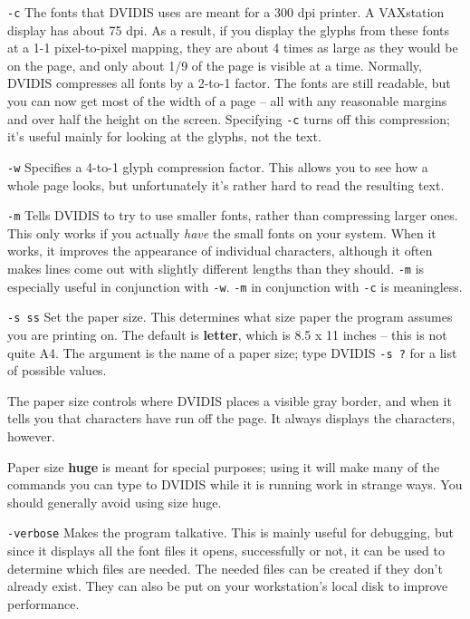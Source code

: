 \begin{list}%
{}%
{\settowidth{\labelwidth}{\tt-verbose a}
\settowidth{\labelsep}{aaaa}
\settowidth{\rightmargin}{aaa}
\addtolength{\labelwidth}{\labelsep}
\setlength{\leftmargin}{\labelwidth}}
%
\item[\tt-c]  The fonts that DVIDIS uses are meant for a 300 dpi printer.
A VAXstation display has about 75 dpi.
As a result, if you display the glyphs from these fonts at a 1-1 pixel-to-pixel
mapping, they are about 4 times as large as they would be on the page, and only
about 1/9 of the page is visible at a time.
Normally, DVIDIS compresses all fonts by a 2-to-1 factor.
The fonts are still readable, but you can now get most of the width of a page --
all with any reasonable margins and over half the height on the screen. 
Specifying {\tt-c} turns off this compression; it's useful mainly for
looking at the glyphs, not the text. 
\item[\tt-w] Specifies a 4-to-1 glyph compression factor.
This allows you to see how a whole page looks, but unfortunately it's rather
hard to read the resulting text.
\item[\tt-m]
Tells DVIDIS to try to use smaller fonts, rather than compressing
larger ones.
This only works if you actually {\it have} the small fonts on your system.
When it works, it improves the appearance of individual
characters, although it often makes lines come out with slightly
different lengths than they should.
{\tt-m} is especially useful in conjunction with {\tt-w}.
{\tt-m} in conjunction with {\tt-c} is meaningless.
\item[\tt-s ss] Set the paper size.
This determines what size paper the program assumes you are printing on.
The default is {\bf letter}, which is 8.5 x 11 inches -- this is not quite A4.
The argument is the name of a paper size; type DVIDIS {\tt-s ?} for a list
of possible values.

The paper size controls where DVIDIS places a visible gray border,
and when it tells you that characters have run off the page. 
It always displays the characters, however.

Paper size {\bf huge} is meant for special purposes; using it will make
many of the commands you can type to DVIDIS while it is running work
in strange ways.
You should generally avoid using size huge.

\item[\tt-verbose]
Makes the program talkative.
This is mainly useful for debugging, but since it displays all the font files
it opens, successfully or not, it can be used to determine which files are
needed.
The needed files can be created if they don't already exist.
They can also be put on your workstation's local disk to improve performance.

\end{list}


